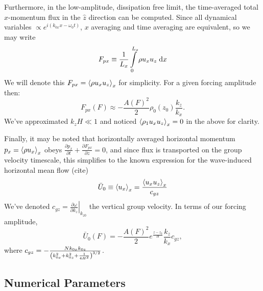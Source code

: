 \documentclass[twocolumn,
        nofootinbib,
        usenames, %
        dvipsnames %
    ]{revtex4-1}%
\newcommand*{\pd}[2]{\frac{\partial#1}{\partial#2}}
\newcommand*{\at}[1]{\left.#1\right|}
\DeclarePairedDelimiter\ev{\langle}{\rangle}
\DeclarePairedDelimiter\p{\lparen}{\rparen}
\begin{document}
%

Furthermore, in the low-amplitude, dissipation free limit, the time-averaged
total $x$-momentum flux in the $\hat{z}$ direction can be computed. Since all
dynamical variables $\propto e^{i(k_{0x}x - \omega_0 t)}$, $x$ averaging and
time averaging are equivalent, so we may write
\begin{equation}
    F_{px} \equiv \frac{1}{L_x}\int_0^{L_x}\limits \rho u_x u_z\;\mathrm{d}x
\end{equation}
We will denote this $F_{px} = \ev*{\rho u_xu_z}_x$ for simplicity. For a given
forcing amplitude then:
\begin{equation}
    F_{px}(F) \approx -\frac{A(F)^2}{2}\rho_0(z_0) \frac{k_z}{k_x}.
        \label{eq:fpx_lin}
\end{equation}
We've approximated $k_zH \ll 1$ and noticed $\ev*{\rho_1 u_xu_z}_x = 0$ in the
above for clarity.

Finally, it may be noted that horizontally averaged horizontal momentum
$p_x = \ev*{\rho u_x}_x$ obeys $\pd{p_x}{t} + \pd{F_{px}}{z} = 0$, and since
flux is transported on the group velocity timescale, this simplifies to the
known expression for the wave-induced horizontal mean flow (cite)
\begin{equation}
    \bar{U}_0 \equiv \ev*{u_x}_x = \frac{\ev*{u_xu_z}_x}{c_{gz}}
\end{equation}
We've denoted $c_{gz} = \at{\pd{\omega}{k_{z}}}_{k_{z0}}$ the vertical group
velocity. In terms of our forcing amplitude,
\begin{equation}
    \bar{U}_0(F) = -\frac{A(F)^2}{2}e^{\frac{z - z_0}{H}} \frac{k_z}{k_x}c_{gz},
        \label{eq:u0_lin}
\end{equation}
where $c_{gz} = -\frac{Nk_{0x}k_{0z}}{\p*{k_{0x}^2 + k_{0z}^2 +
\frac{1}{4H^2}}^{3/2}}$.

\subsection{Numerical Parameters}\label{ss:numerics}

\end{document}
